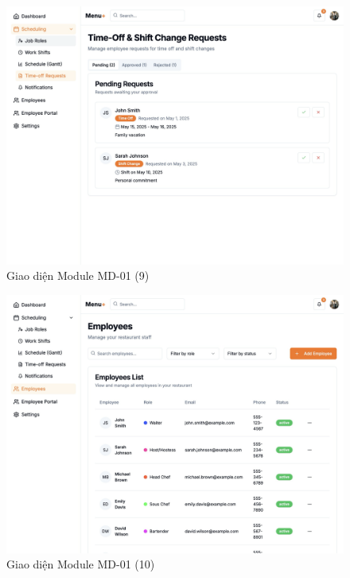 \begin{figure}[H]
    \centering
    \includegraphics[width=\linewidth]{Sections/hien_thuc/img/1.9.png}
    \vspace{0.5cm}
    \caption{Giao diện Module MD-01 (9)}
    \label{fig:gantt_module_md01_9}
\end{figure}

\begin{figure}[H]
    \centering
    \includegraphics[width=\linewidth]{Sections/hien_thuc/img/1.10.png}
    \vspace{0.5cm}
    \caption{Giao diện Module MD-01 (10)}
    \label{fig:gantt_module_md01_10}
\end{figure}

